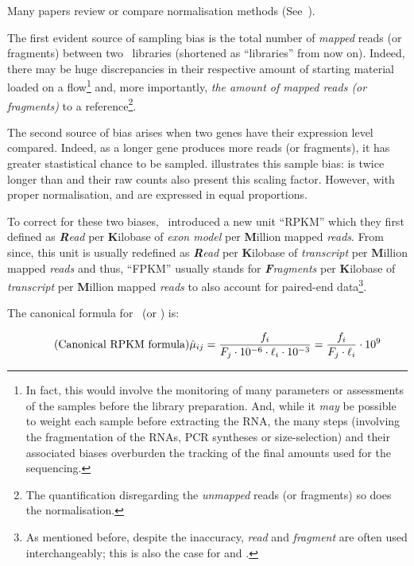 Many papers review or compare normalisation methods (See~).

The first evident source of sampling bias is the total number of \emph{mapped}
reads (or fragments) between two \Rnaseq\ libraries (shortened as
\enquote{libraries} from now on). Indeed, there may be huge discrepancies in
their respective amount of starting material loaded on a
\gls{flow}\footnote{In fact, this would involve the monitoring of many parameters
or assessments of the samples before the library preparation. And, while
it \emph{may} be possible to weight each sample before extracting the \gls{RNA},
the many steps (involving the fragmentation of the \glspl{RNA},
\gls{PCR} syntheses or size-selection) and their associated biases
overburden the tracking of the final amounts used for the sequencing.}
and, more importantly, \emph{the amount of mapped reads (or
fragments)} to a reference\footnote{The quantification disregarding the
\emph{unmapped} reads (or fragments) so does the normalisation.}.

The second source of bias arises when two genes have their expression level
compared. Indeed, as a longer gene produces more reads (or fragments), it has
greater stastistical chance to be sampled.  illustrates
this sample bias:  is twice longer than  and their
raw counts also present this scaling factor. However, with proper normalisation,
 and  are expressed in equal proportions.

To correct for these two biases,~\cite{Mortazavi2008} introduced a new unit
\enquote{RPKM} which they first defined as \emph{\textbf{R}ead} per
\textbf{K}ilobase of \emph{exon model} per \textbf{M}illion mapped \emph{reads}.
From since, this unit is usually redefined as \emph{\textbf{R}ead} per
\textbf{K}ilobase of \emph{transcript} per \textbf{M}illion mapped \emph{reads}
and thus, \enquote{FPKM} usually stands for  \emph{\textbf{F}ragments} per
\textbf{K}ilobase of \emph{transcript} per \textbf{M}illion mapped \emph{reads}
to also account for paired-end data\footnote{As mentioned before,
despite the inaccuracy, \emph{read} and \emph{fragment} are often used
interchangeably; this is also the case for \emph{\RPKM} and \emph{\FPKM}.}.

The canonical formula for \FPKM\ (or \RPKM) is:

\begin{equation}
    \tag{Canonical RPKM formula}\label{eq:rpkm-fx}
\hat{\mu}_{ij}=\frac{f_i}{F_j\cdot10^{-6} \cdot \ell_i\cdot10^{-3}}
              =\frac{f_i}{F_j\cdot\ell_i}\cdot10^{9} \text{\,}
\end{equation}

